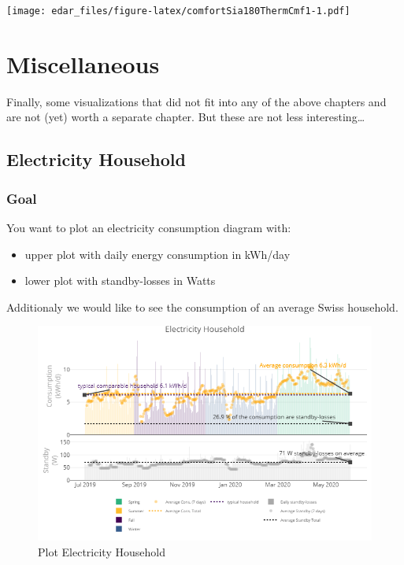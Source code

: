 \documentclass[
  a4paperpaper,
]{book}
\providecommand{\tightlist}{%
  \setlength{\itemsep}{0pt}\setlength{\parskip}{0pt}}
\begin{document}
\texttt{[image: edar\_files/figure-latex/comfortSia180ThermCmf1-1.pdf]}

\hypertarget{miscellaneous}{%
\chapter{Miscellaneous}\label{miscellaneous}}

Finally, some visualizations that did not fit into any of the above chapters and are not (yet) worth a separate chapter. But these are not less interesting\ldots{}

\newpage

\hypertarget{electricity-household}{%
\section{Electricity Household}\label{electricity-household}}

\hypertarget{goal-21}{%
\subsection{Goal}\label{goal-21}}

You want to plot an electricity consumption diagram with:

\begin{itemize}
\tightlist
\item
  upper plot with daily energy consumption in kWh/day
\item
  lower plot with standby-losses in Watts
\end{itemize}

Additionaly we would like to see the consumption of an average Swiss household.

\begin{figure}
\includegraphics[width=0.7\linewidth]{images/eleHousehold} \caption{Plot Electricity Household}\label{fig:unnamed-chunk-32}
\end{figure}
\end{document}
